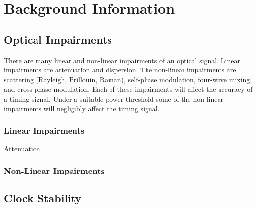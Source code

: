 \label{chap:fiber_impairments}

\section{Background Information} \label{sec_background}



\subsection{Optical Impairments}

There are many linear and non-linear impairments of an optical signal.  Linear impairments are attenuation and dispersion.  The non-linear impairments are scattering (Rayleigh, Brillouin, Raman), self-phase modulation, four-wave mixing, and cross-phase modulation. Each of these impairments will affect the accuracy of a timing signal. Under a suitable power threshold some of the non-linear impairments will negligibly affect the timing signal.

\subsubsection{Linear Impairments}

\large{Attenuation}

\subsubsection{Non-Linear Impairments}



\subsection{Clock Stability}
